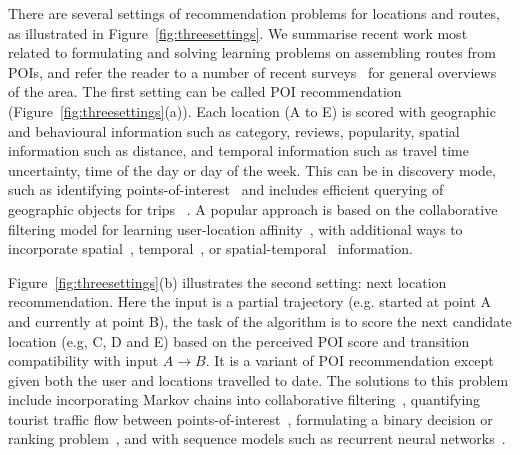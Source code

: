 
There are several settings of recommendation problems for locations and routes, as illustrated in Figure~\ref{fig:threesettings}.
We summarise recent work most related to formulating and solving learning problems on assembling routes from POIs,
and refer the reader to a number of recent surveys~\cite{bao2015recommendations,zheng2015trajectory,zheng2014urban} for general overviews of the area.
The first setting can be called POI recommendation (Figure~\ref{fig:threesettings}(a)). Each location (A to E) is scored with geographic and behavioural information such as category, reviews, popularity, spatial information such as distance, and temporal information such as travel time uncertainty, time of the day or day of the week.
This can be in discovery mode, such as identifying points-of-interest~\cite{zheng2009mining,li2015instagram} and includes efficient querying of geographic objects for trips ~\cite{hashem2015efficient}.
A popular approach is based on the collaborative filtering model
for learning user-location affinity~\cite{shi2011personalized}, with additional ways to incorporate spatial~\cite{lian2014geomf,liu2014exploiting}, temporal~\cite{yuan2013timeaware,hsieh2014mining,gao2013temporal}, or spatial-temporal~\cite{yuan2014graph} information.

Figure~\ref{fig:threesettings}(b) illustrates the second setting: next location recommendation.
Here the input is a partial trajectory (e.g. started at point A and currently at point B), the task of the algorithm is to score the next candidate location (e.g, C, D and E) based on the perceived POI score and transition compatibility with input $A\rightarrow B$.
It is a variant of POI recommendation except given both the user and locations travelled to date. The solutions to this problem include incorporating Markov chains into collaborative filtering~\cite{fpmc10,ijcai13,zhang2015location},
quantifying tourist traffic flow between points-of-interest~\cite{zheng2012patterns},
formulating a binary decision or ranking problem~\cite{baraglia2013learnext}, and with sequence models such as recurrent neural networks~\cite{aaai16}.


